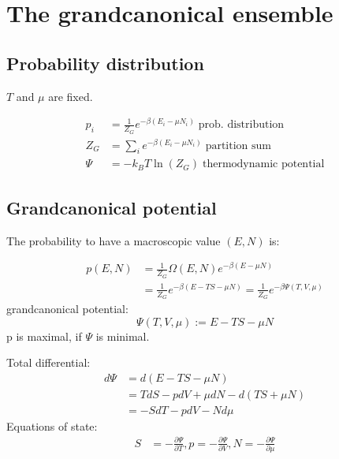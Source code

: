 \section{The grandcanonical ensemble}

\subsection*{Probability distribution}
$T$ and $\mu$ are fixed.

\begin{equation*}
    \begin{aligned}
        p_i &= \frac{1}{Z_G} e^{-\beta (E_i - \mu N_i)} \; \text{prob. distribution} \\
        Z_G &= \sum_i e^{-\beta (E_i - \mu N_i)} \; \text{partition sum} \\
        \Psi &= -k_B T \ln(Z_G) \; \text{thermodynamic potential}
    \end{aligned}
\end{equation*}

\subsection*{Grandcanonical potential}
The probability to have a macroscopic value $(E,N)$ is:

\begin{equation*}
    \begin{aligned}
        p(E,N) &= \frac{1}{Z_G} \Omega(E,N) e^{-\beta(E-\mu N)} \\
            &= \frac{1}{Z_G} e^{-\beta(E-TS-\mu N)} = \frac{1}{Z_G} e^{-\beta \Psi(T,V,\mu)}
    \end{aligned}
\end{equation*}
grandcanonical potential:
\begin{equation*}
    \Psi(T,V,\mu) := E-TS-\mu N
\end{equation*}
p is maximal, if $\Psi$ is minimal. 

Total differential:
\begin{equation*}
    \begin{aligned}
        d\Psi &= d(E-TS-\mu N) \\
            &= TdS - pdV + \mu dN - d(TS + \mu N) \\
            &= -SdT -pdV - Nd\mu
    \end{aligned}
\end{equation*}
Equations of state:
\begin{equation*}
    \begin{aligned}
        S &= - \frac{\partial \Psi}{\partial T} , p = - \frac{\partial \Psi}{\partial V}, N = - \frac{\partial \Psi}{\partial \mu}
    \end{aligned}
\end{equation*}

